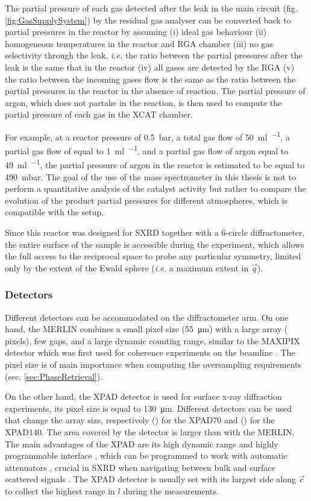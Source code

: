 The partial pressure of each gas detected after the leak in the main circuit (fig. \ref{fig:GasSupplySystem}) by the residual gas analyser can be converted back to partial pressures in the reactor by assuming (i) ideal gas behaviour (ii) homogeneous temperatures in the reactor and RGA chamber (iii) no gas selectivity through the leak, \textit{i.e.} the ratio between the partial pressures after the leak is the same that in the reactor (iv) all gases are detected by the RGA (v) the ratio between the incoming gases flow is the same as the ratio between the partial pressures in the reactor in the absence of reaction.
The partial pressure of argon, which does not partake in the reaction, is then used to compute the partial pressure of each gas in the XCAT chamber.

For example, at a reactor pressure of \qty{0.5}{\bar}, a total gas flow of \qty{50}{\ml\per\min}, a partial gas flow of  equal to \qty{1}{\ml\per\min}, and a partial gas flow of argon equal to \qty{49}{\ml\per\min}, the partial pressure of argon in the reactor is estimated to be equal to \qty{490}{\milli\bar}.
The goal of the use of the mass spectrometer in this thesis is not to perform a quantitative analysis of the catalyst activity but rather to compare the evolution of the product partial pressures for different atmospheres, which is compatible with the setup.

Since this reactor was designed for SXRD together with a 6-circle diffractometer, the entire surface of the sample is accessible during the experiment, which allows the full access to the reciprocal space to probe any particular symmetry, limited only by the extent of the Ewald sphere (\textit{i.e.} a maximum extent in $\vec{q}$).

\subsubsection{Detectors}

Different detectors can be accommodated on the diffractometer arm.
On one hand, the MERLIN \parencite{Bewley2006} combines a small pixel size (\qty{55}{\um}) with a large array ( pixels), few gaps, and a large dynamic counting range, similar to the MAXIPIX detector \parencite{Ponchut2011} which was first used for coherence experiments on the beamline \parencite{Schavkan2013, Li2020}.
The pixel size is of main importance when computing the oversampling requirements (sec. \ref{sec:PhaseRetrieval}).

On the other hand, the XPAD detector \parencite{Basolo2005, Dawiec2016} is used for surface x-ray diffraction experiments, its pixel size is equal to \qty{130}{\um}.
Different detectors can be used that change the array size, respectively () for the XPAD70 and () for the XPAD140.
The area covered by the detector is larger than with the MERLIN.
The main advantages of the XPAD are its high dynamic range and highly programmable interface \parencite{Fertey2013}, which can be programmed to work with automatic attenuators \parencite{Dawiec2016}, crucial in SXRD when navigating between bulk and surface scattered signals .
The XPAD detector is usually set with its largest side along $\vec{c}$ to collect the highest range in $l$ during the measurements.